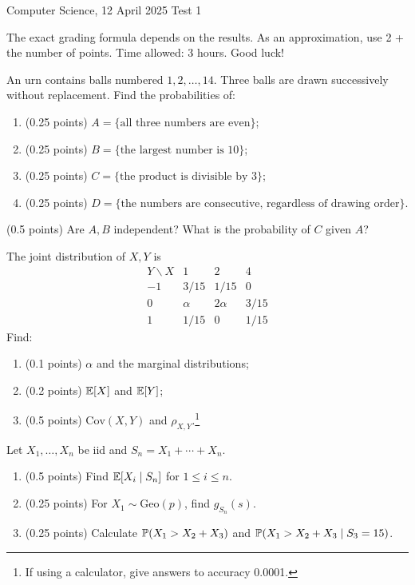 \documentclass[a4paper]{report}
\begin{document}
\noindent Computer Science, 12 April 2025 \hfill Test 1
\hrulefill
\begin{it}The exact grading formula depends on the results. As an approximation, use 2 + the number of points. Time allowed: 3 hours. Good luck!\end{it}
\begin{problem}
An urn contains balls numbered $1,2,\ldots,14$. Three balls are drawn successively without replacement. Find the probabilities of:
\begin{enumerate}
\item (0.25 points) $A=\{\text{all three numbers are even}\}$;
\item (0.25 points) $B=\{\text{the largest number is 10}\}$;
\item (0.25 points) $C=\{\text{the product is divisible by 3}\}$;
\item (0.25 points) $D=\{\text{the numbers are consecutive, regardless of drawing order}\}$.
\end{enumerate}
(0.5 points) Are $A,B$ independent? What is the probability of $C$ given $A$?
\end{problem}
\begin{problem}
The joint distribution of $X,Y$ is
\[\begin{array}{c|ccc}Y\backslash X&1&2&4\\\hline-1&3/15&1/15&0\\0&\alpha&2\alpha&3/15\\1&1/15&0&1/15\end{array}\]
Find:
\begin{enumerate}
\item (0.1 points) $\alpha$ and the marginal distributions;
\item (0.2 points) $\E[X]$ and $\E[Y]$;
\item (0.5 points) $\mathrm{Cov}(X,Y)$ and $\rho_{X,Y}$.\footnote{If using a calculator, give answers to accuracy 0.0001.}
\end{enumerate}
\end{problem}
\begin{problem}
Let $X_1,\ldots,X_n$ be iid and $S_n=X_1+\cdots+X_n$.
\begin{enumerate}
\item (0.5 points) Find $\E[X_i\mid S_n]$ for $1\leq i\leq n$.
\item (0.25 points) For $X_1\sim\mathrm{Geo}(p)$, find $g_{S_n}(s)$.
\item (0.25 points) Calculate $\P(X_1>X_2+X_3)$ and $\P(X_1>X_2+X_3\mid S_3=15)$.
\end{enumerate}
\end{problem}
\end{document}
